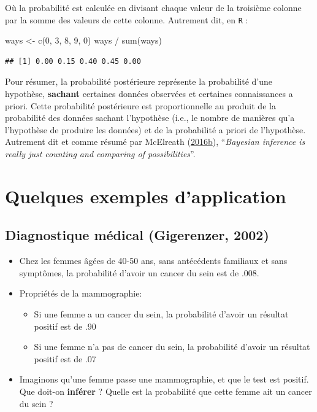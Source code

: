 \documentclass[
  a4paper,11pt,twoside,onecolumn,openright,final,oldfontcommands]{memoir}
\newenvironment{Shaded}{\begin{snugshade}}{\end{snugshade}}
\newcommand{\DecValTok}[1]{\textcolor[rgb]{0.00,0.00,0.81}{#1}}
\newcommand{\FunctionTok}[1]{\textcolor[rgb]{0.00,0.00,0.00}{#1}}
\newcommand{\NormalTok}[1]{#1}
\newcommand{\OtherTok}[1]{\textcolor[rgb]{0.56,0.35,0.01}{#1}}
\newcommand{\SpecialCharTok}[1]{\textcolor[rgb]{0.00,0.00,0.00}{#1}}
\providecommand{\tightlist}{%
  \setlength{\itemsep}{0pt}\setlength{\parskip}{0pt}}
\theoremstyle{definition}
\theoremstyle{definition}
\theoremstyle{definition}
\theoremstyle{definition}
\theoremstyle{remark}
\begin{document}
Où la probabilité est calculée en divisant chaque valeur de la troisième colonne par la somme des valeurs de cette colonne. Autrement dit, en \texttt{R} :

\begin{Shaded}
\begin{Highlighting}[]
\NormalTok{ways }\OtherTok{\textless{}{-}} \FunctionTok{c}\NormalTok{(}\DecValTok{0}\NormalTok{, }\DecValTok{3}\NormalTok{, }\DecValTok{8}\NormalTok{, }\DecValTok{9}\NormalTok{, }\DecValTok{0}\NormalTok{)}
\NormalTok{ways }\SpecialCharTok{/} \FunctionTok{sum}\NormalTok{(ways)}
\end{Highlighting}
\end{Shaded}

\begin{verbatim}
## [1] 0.00 0.15 0.40 0.45 0.00
\end{verbatim}

Pour résumer, la probabilité postérieure représente la probabilité d'une hypothèse, \textbf{sachant} certaines données observées et certaines connaissances a priori. Cette probabilité postérieure est proportionnelle au produit de la probabilité des données sachant l'hypothèse (i.e., le nombre de manières qu'a l'hypothèse de produire les données) et de la probabilité a priori de l'hypothèse. Autrement dit et comme résumé par McElreath (\protect\hyperlink{ref-mcelreath_statistical_2016}{2016b}), ``\emph{Bayesian inference is really just counting and comparing of possibilities}''.

\hypertarget{quelques-exemples-dapplication}{%
\section{Quelques exemples d'application}\label{quelques-exemples-dapplication}}

\hypertarget{diagnostique-muxe9dical-gigerenzer-2002}{%
\subsection{Diagnostique médical (Gigerenzer, 2002)}\label{diagnostique-muxe9dical-gigerenzer-2002}}

\begin{itemize}
\item
  Chez les femmes âgées de 40-50 ans, sans antécédents familiaux et sans symptômes, la probabilité d'avoir un cancer du sein est de .008.
\item
  Propriétés de la mammographie:

  \begin{itemize}
  \tightlist
  \item
    Si une femme a un cancer du sein, la probabilité d'avoir un résultat positif est de .90
  \item
    Si une femme n'a pas de cancer du sein, la probabilité d'avoir un résultat positif est de .07
  \end{itemize}
\item
  Imaginons qu'une femme passe une mammographie, et que le test est positif. Que doit-on \textbf{inférer} ? Quelle est la probabilité que cette femme ait un cancer du sein ?
\end{itemize}
\end{document}

